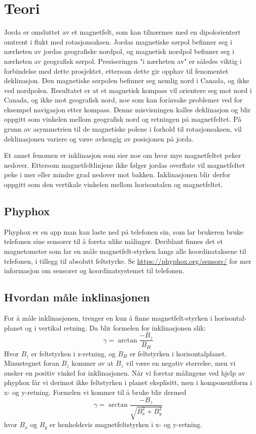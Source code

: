 \section{Teori}
Jorda er omsluttet av et magnetfelt, som kan tilnærmes med en 
dipolorientert omtrent i flukt med rotasjonsaksen. Jordas magnetiske sørpol 
befinner seg i nærheten av jordas geografiske nordpol, og magnetisk nordpol 
befinner seg i nærheten av geografisk sørpol. Presiseringen "i nærheten av" 
er således viktig i forbindelse med dette prosjektet, ettersom dette gir 
opphav til fenomentet deklinasjon. Den magnetiske sørpolen befinner seg 
nemlig nord i Canada, og ikke ved nordpolen. Resultatet er at et magnetisk 
kompass vil orientere seg mot nord i Canada, og ikke mot geografisk nord, 
noe som kan forårsake problemer ved for eksempel navigasjon etter kompass. 
Denne misvisningen kalles deklinasjon og blir oppgitt som vinkelen mellom 
geografisk nord og retningen på magnetfeltet. På grunn av asymmetrien til 
de magnetiske polene i forhold til rotasjonsaksen, vil deklinasjonen 
variere og være avhengig av posisjonen på jorda.

Et annet fenomen er inklinasjon som sier noe om hvor mye magnetfeltet peker 
nedover. Ettersom magnetfeltlinjene ikke følger jordas overflate vil 
magnetfeltet peke i mer eller mindre grad nedover mot bakken. Inklinasjonen 
blir derfor oppgitt som den vertikale vinkelen mellom horisontalen og
magnetfeltet.

\subsection{Phyphox}
Phyphox er en app man kan laste ned på telefonen sin, som lar brukeren 
bruke telefonen sine sensorer til å foreta ulike målinger. Deriblant finnes 
det et magnetometer som lar en måle magnetfelt-styrken langs alle 
koordinataksene til telefonen, i tillegg til absolutt feltstyrke. Se 
\hyperlink{https://phyphox.org/sensors/}{https://phyphox.org/sensors/}
for mer informasjon om sensorer og koordinatsystemet til telefonen.

\subsection{Hvordan måle inklinasjonen}
For å måle inklinasjonen, trenger en kun å finne magnetfelt-styrken i horisontal-
planet og i vertikal retning. Da blir formelen for inklinasjonen slik:
\begin{equation}
    \gamma = \arctan \frac{-B_z}{B_H}
\end{equation}
Hvor $B_z$ er feltstyrken i z-retning, og $B_H$ er feltstyrken i horisontalplanet. 
Minustegnet foran $B_z$ kommer av at $B_z$ vil være en negativ størrelse, men vi 
ønsker en positiv vinkel for inklinasjonen. Når vi foretar målingene ved hjelp av 
phyphox får vi derimot ikke feltstyrken i planet eksplisitt, men i komponentform i 
x- og y-retning. Formelen vi kommer til å bruke blir dermed
\begin{equation}
    \gamma = \arctan{ \frac{-B_z}{\sqrt{B_x^2 + B_y^2}} }
\end{equation}
hvor $B_x$ og $B_y$ er henholdsvis magnetfeltstyrken i x- og y-retning.

